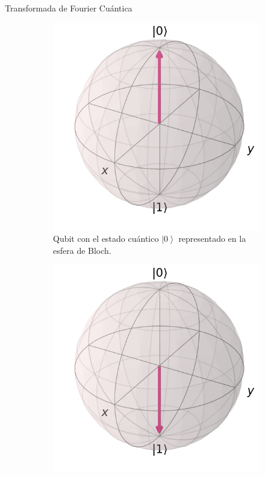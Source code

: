 \begin{frame}{Transformada de Fourier Cuántica}
    \begin{figure}[H]
    \begin{subfigure}{0.49\linewidth}
        \centering
        \includegraphics[scale=0.125]{images/0.png}
        \caption{Qubit con el estado cuántico $\left|0 \right\rangle$ representado en la esfera de Bloch.}
    \end{subfigure}
    \begin{subfigure}{0.49\linewidth}
        \centering
        \includegraphics[scale=0.125]{images/1.png}

\end{subfigure}
\end{figure}
\end{frame}
